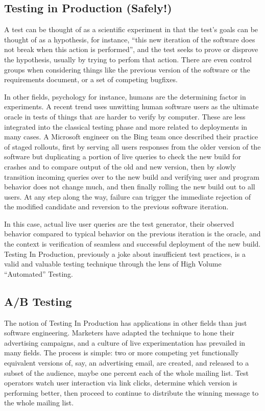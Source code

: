 \subsection{Testing in Production (Safely!)}
A test can be thought of as a scientific experiment in that the test's goals can be thought of as a hypothesis, for instance, ``this new iteration of the software does not break when this action is performed'', and the test seeks to prove or disprove the hypothesis, usually by trying to perfom that action. There are even control groups when considering things like the previous version of the software or the requirements document, or a set of competing bugfixes.

In other fields, psychology for instance, humans are the determining factor in experiments. A recent trend uses unwitting human software users as the ultimate oracle in tests of things that are harder to verify by computer. These are less integrated into the classical testing phase and more related to deployments in many cases. A Microsoft engineer on the Bing team once described their practice of staged rollouts, first by serving all users responses from the older version of the software but duplicating a portion of live queries to check the new build for crashes and to compare output of the old and new version, then by slowly transition incoming queries over to the new build and verifying user and program behavior does not change much, and then finally rolling the new build out to all users. At any step along the way, failure can trigger the immediate rejection of the modified candidate and reversion to the previous software iteration. \citep{AndrewsHeal}

In this case, actual live user queries are the test generator, their observed behavior compared to typical behavior on the previous iteration is the oracle, and the context is verification of seamless and successful deployment of the new build. Testing In Production, previously a joke about insufficient test practices, is a valid and valuable testing technique through the lens of High Volume ``Automated'' Testing.

\subsection{A/B Testing}
The notion of Testing In Production has applications in other fields than just software engineering. Marketers have adapted the technique to hone their advertising campaigns, and a culture of live experimentation has prevailed in many fields. The process is simple: two or more competing yet functionally equivalent versions of, say, an advertising email, are created, and released to a subset of the audience, maybe one percent each of the whole mailing list. Test operators watch user interaction via link clicks, determine which version is performing better, then proceed to continue to distribute the winning message to the whole mailing list.


